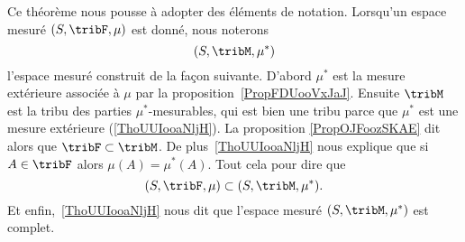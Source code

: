 \begin{normaltext}

Ce théorème nous pousse à adopter des éléments de notation. Lorsqu'un espace mesuré \( (S,\tribF,\mu)\) est donné, nous noterons
\begin{equation}
    (S,\tribM,\mu^*)
\end{equation}
l'espace mesuré construit de la façon suivante. D'abord \( \mu^*\) est la mesure extérieure associée à \( \mu\) par la proposition~\ref{PropFDUooVxJaJ}. Ensuite \( \tribM\) est la tribu des parties \( \mu^*\)-mesurables, qui est bien une tribu parce que \( \mu^*\) est une mesure extérieure (\ref{ThoUUIooaNljH}). La proposition \eqref{PropOJFoozSKAE} dit alors que \( \tribF\subset\tribM\). De plus~\ref{ThoUUIooaNljH} nous explique que si \( A\in\tribF\) alors \( \mu(A)=\mu^*(A)\). Tout cela pour dire que
\begin{equation}    \label{EqXDPooKwWAF}
    (S,\tribF,\mu)\subset (S,\tribM,\mu^*).
\end{equation}
Et enfin,~\ref{ThoUUIooaNljH} nous dit que l'espace mesuré \( (S,\tribM,\mu^*)\) est complet.
\end{normaltext}

